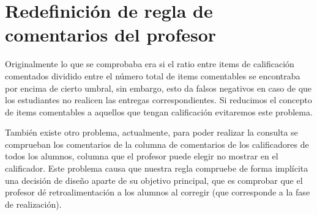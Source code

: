 \section{Redefinición de regla de comentarios del profesor}
Originalmente lo que se comprobaba era si el ratio entre items de calificación comentados dividido entre el número total de items comentables se encontraba por encima de cierto umbral, sin embargo, esto da falsos negativos en caso de que los estudiantes no realicen las entregas correspondientes. Si reducimos el concepto de items comentables a aquellos que tengan calificación evitaremos este problema.

También existe otro problema, actualmente, para poder realizar la consulta se comprueban los comentarios de la columna de comentarios de los calificadores de todos los alumnos, columna que el profesor puede elegir no mostrar en el calificador. Este problema causa que nuestra regla compruebe de forma implícita una decisión de diseño aparte de su objetivo principal, que es comprobar que el profesor dé retroalimentación a los alumnos al corregir (que corresponde a la fase de realización).